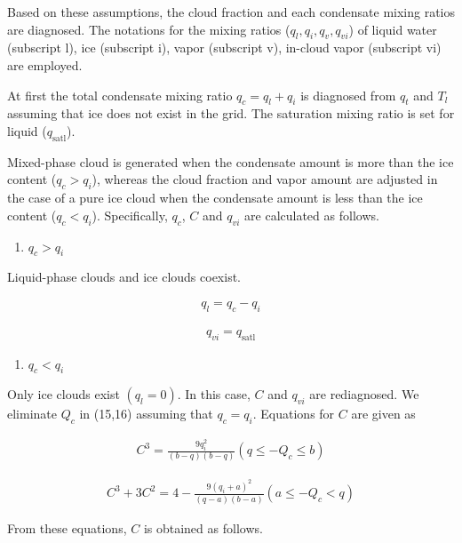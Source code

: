 Based on these assumptions, the cloud fraction and each condensate mixing ratios are diagnosed. The notations for the mixing ratios (\(q_l, q_i, q_v, q_{vi}\)) of liquid water (subscript l), ice
(subscript i), vapor (subscript v), in-cloud vapor (subscript vi) are employed.

At first the total condensate mixing ratio \(q_c=q_l+q_i\) is diagnosed from \(q_t\) and \(T_l\) assuming that ice does not exist in the grid. The saturation mixing ratio is set for liquid
(\(q_{\text{satl}}\)).

Mixed-phase cloud is generated when the condensate amount is more than the ice content (\(q_c>q_i\)), whereas the cloud fraction and vapor amount are adjusted in the case of a pure ice cloud when the
condensate amount is less than the ice content (\(q_c<q_i\)). Specifically, \(q_c\), \(C\) and \(q_{vi}\) are calculated as follows.

\begin{enumerate}
\def\labelenumi{\arabic{enumi}.}
\tightlist
\item
  \(q_c>q_i\)
\end{enumerate}

Liquid-phase clouds and ice clouds coexist.

\begin{eqnarray}
q_l= q_c-q_i
\end{eqnarray}

\begin{eqnarray}
q_{vi} = q_{\text{satl}}
\end{eqnarray}

\begin{enumerate}
\def\labelenumi{\arabic{enumi}.}
\setcounter{enumi}{1}
\tightlist
\item
  \(q_c<q_i\)
\end{enumerate}

Only ice clouds exist \((q_l=0)\). In this case, \(C\) and \(q_{vi}\) are rediagnosed. We eliminate \(Q_c\) in (15,16) assuming that \(q_c=q_i\). Equations for \(C\) are given as

\begin{eqnarray}
C^{3}=\frac{9 q_{i}^{2}}{(b-q)(b-q)} \left(q \leq-Q_{c} \leq b\right)
\end{eqnarray}

\begin{eqnarray}
C^{3}+3 C^{2}=4-\frac{9\left(q_{i}+a\right)^{2}}{(q-a)(b-a)} \left(a \leq-Q_{c}<q\right)
\end{eqnarray}

From these equations, \(C\) is obtained as follows.

